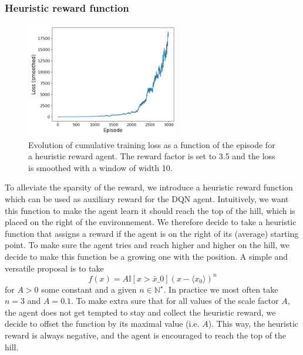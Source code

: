 \documentclass[a4paper, 12pt,oneside]{article}
\begin{document}
        \subsubsection{Heuristic reward function}
        \begin{figure}
            \centering
            \vspace{-1em}
            \includegraphics[width=0.6\textwidth]{../runs/dqn_heuristic/up-tau=3_d=2_frac=3.5/figs/loss}
            \caption{Evolution of cumulative training loss as a function of the episode for a heuristic reward agent. The reward factor is set to 3.5 and the loss is smoothed with a window of width 10.}
            \label{fig:dqn-heuristic-frac=3.5-loss}
        \end{figure}
        To alleviate the sparsity of the reward, we introduce a heuristic reward function which can be used as auxiliary reward for the DQN agent. Intuitively, we want this function to make the agent learn it should reach the top of the hill, which is placed on the right of the environnement. We therefore decide to take a heuristic function that assigns a reward if the agent is on the right of its (average) starting point. To make sure the agent tries and reach higher and higher on the hill, we decide to make this function be a growing one with the position. A simple and versatile proposal is to take 
        $$
        f(x) = A\mathbb I[x>\bar x\_0](x-\langle{x_0}\rangle)^n
        $$
        for $A>0$ some constant and a given $n\in\mathbb N^\star$. In practice we most often take $n=3$ and $A=0.1$. To make extra sure that for all values of the scale factor $A$, the agent does not get tempted to stay and collect the heuristic reward, we decide to offset the function by its maximal value (i.e. $A$). This way, the heuristic reward is always negative, and the agent is encouraged to reach the top of the hill.
\end{document}
